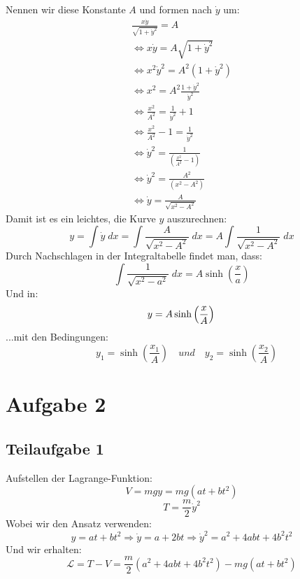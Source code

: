 \documentclass[a4paper,german,12pt,smallheadings]{scrartcl}
\begin{document}
Nennen wir diese Konstante $A$ und formen nach $\dot{y}$ um:
\begin{align*}
\frac{x \dot{y}}{\sqrt{1+ \dot{y}^2}}=A\\
\Leftrightarrow x \dot{y}=A \sqrt{1+\dot{y}^2}\\
\Leftrightarrow x^2 \dot{y}^2=A^2\left(1+\dot{y}^2\right)\\
\Leftrightarrow x^2=A^2 \frac{1+\dot{y}^2}{\dot{y}^2}\\
\Leftrightarrow \frac{x^2}{A^2}=\frac{1}{\dot{y}^2}+1\\
\Leftrightarrow \frac{x^2}{A^2}-1=\frac{1}{\dot{y}^2}\\
\Leftrightarrow \dot{y}^2=\frac{1}{\left(\frac{x^2}{A^2}-1\right)}\\
\Leftrightarrow \dot{y}^2=\frac{A^2}{\left(x^2-A^2\right)}\\
\Leftrightarrow \dot{y}=\frac{A}{\sqrt{x^2-A^2}}
\end{align*}
Damit ist es ein leichtes, die Kurve $y$ auszurechnen:
\begin{equation}
y=\int \dot{y} \; dx=\int \frac{A}{\sqrt{x^2-A^2}} \; dx=A \int \frac{1}{\sqrt{x^2-A^2}} \; dx
\end{equation}
Durch Nachschlagen in der Integraltabelle findet man, dass:
\begin{equation}
\int \frac{1}{\sqrt{x^2-a^2}} \; dx=A \sinh\left(\frac{x}{a}\right)
\end{equation}
Und in:
\begin{equation}
y=A \sinh\left(\frac{x}{A}\right) \quad\\ 
\end{equation}
...mit den Bedingungen:
\begin{equation}
\quad y_1=\sinh\left(\frac{x_1}{A}\right) \quad und \quad y_2=\sinh\left(\frac{x_2}{A}\right)
\end{equation}

\section*{Aufgabe 2}
\subsection*{Teilaufgabe 1}
Aufstellen der Lagrange-Funktion:
\begin{equation}
V=mgy=mg\left(at+bt^2\right)
\end{equation}
\begin{equation}
T=\frac{m}{2} \dot{y}^2
\end{equation}
Wobei wir den Ansatz verwenden:
\begin{equation}
y=at+bt^2 \Rightarrow \dot{y}=a+2bt \Rightarrow \dot{y}^2=a^2+4abt+4b^2t^2
\end{equation}
Und wir erhalten:
\begin{equation}
\mathcal{L}=T-V=\frac{m}{2} \left(a^2+4abt+4b^2t^2\right) - mg\left(at+bt^2\right)
\end{equation}
\end{document}
